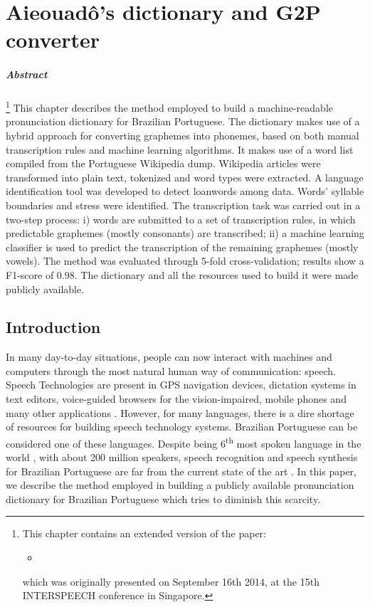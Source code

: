 \chapter{Aieouad\^o's dictionary and G2P converter}\label{ch:aieouado-g2p}

\paragraph{Abstract}
\footnote{This chapter contains an extended version of the paper:

\begin{itemize}
 \item {}
\end{itemize}

which was originally presented on September 16th 2014, at the 15th INTERSPEECH conference in Singapore.} This chapter describes the method employed to build a machine-readable 
pronunciation 
dictionary for Brazilian Portuguese. The dictionary makes use of a hybrid approach for
converting graphemes into phonemes, based on both manual transcription rules and machine
learning algorithms. It makes use of a word list compiled from the Portuguese
Wikipedia dump. Wikipedia articles were transformed into plain text, tokenized and 
word types were extracted. A language identification tool was developed to detect 
loanwords among data. Words' syllable boundaries and stress were identified.
The transcription task was carried out in a two-step process: i) words are submitted
to a set of transcription rules, in which predictable graphemes (mostly consonants)
are transcribed; ii) a machine learning classifier is used to predict the transcription of the 
remaining graphemes (mostly vowels). The method was evaluated through 5-fold cross-validation; 
results show a F1-score of 0.98. The dictionary and all the resources used to build it 
were made publicly available.

\section{Introduction}

In many day-to-day situations, people can now interact with machines and computers through the
most natural human way of communication: speech. Speech Technologies are present in GPS navigation devices, dictation
systems in text editors, voice-guided browsers for the vision-impaired, mobile phones and many other applications \cite{Godwin2009}. 
However, for many languages, there is a dire shortage of resources for building speech technology systems. 
Brazilian Portuguese can be considered one of these languages. Despite being 6\textsuperscript{th} most
spoken language in the world \cite{Ethnologue2013}, with about 200 million speakers, speech recognition and speech 
synthesis for Brazilian Portuguese are far from the current state of the art \cite{Neto2011}. In this paper, we describe the method 
employed in building a publicly available pronunciation dictionary for Brazilian Portuguese which tries to
diminish this scarcity. 

